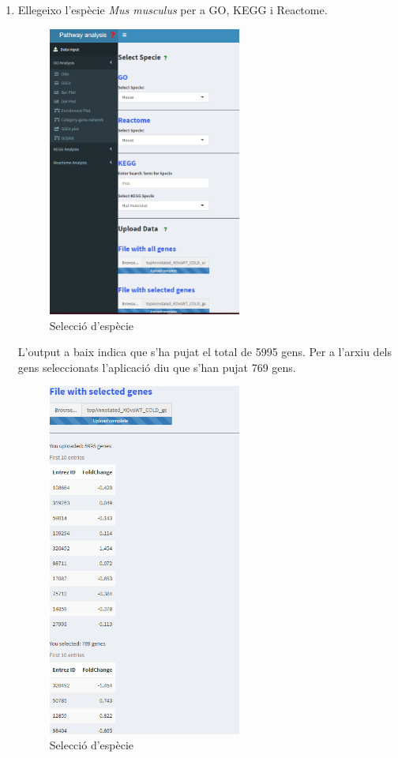 \begin{enumerate}

\item Ellegeixo l'espècie \textit{Mus musculus} per a GO, KEGG i Reactome.
\begin{figure}[H]
\centering
\includegraphics[width=0.6\textwidth]{figures/Estudi1_Fig1_Select_Specie.png} 
\caption{Selecció d'espècie}
\end{figure}

L'output a baix indica que s'ha pujat el total de 5995 gens. Per a l'arxiu dels gens seleccionats l'aplicació diu que s'han pujat 769 gens.

\begin{figure}[H]
\centering
\includegraphics[width=0.6\textwidth]{figures/Estudi1_Fig2_Select_Specie.png} 
\caption{Selecció d'espècie}
\end{figure}



\end{enumerate}
